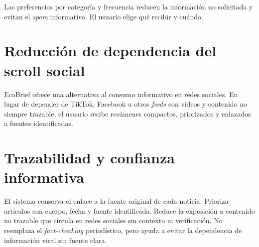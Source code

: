 Las preferencias por categor\'ia y frecuencia reducen la informaci\'on no solicitada y evitan el \textit{spam} informativo. El usuario elige qu\'e recibir y cu\'ando.

\section{Reducci\'on de dependencia del scroll social}

EcoBrief ofrece una alternativa al consumo informativo en redes sociales. En lugar de depender de TikTok, Facebook u otros \textit{feeds} con videos y contenido no siempre trazable, el usuario recibe res\'umenes compactos, priorizados y enlazados a fuentes identificadas.

\section{Trazabilidad y confianza informativa}

El sistema conserva el enlace a la fuente original de cada noticia. Prioriza art\'iculos con cuerpo, fecha y fuente identificada. Reduce la exposici\'on a contenido no trazable que circula en redes sociales sin contexto ni verificaci\'on. No reemplaza el \textit{fact-checking} period\'istico, pero ayuda a evitar la dependencia de informaci\'on viral sin fuente clara.
